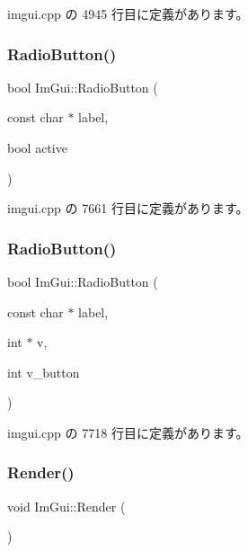 imgui.\+cpp の 4945 行目に定義があります。

\mbox{\label{namespace_im_gui_a6b146763845cbad5a4144772279631bc}} 
\subsubsection{\texorpdfstring{Radio\+Button()}{RadioButton()}\hspace{0.1cm}{\footnotesize\ttfamily [1/2]}}
{\footnotesize\ttfamily bool Im\+Gui\+::\+Radio\+Button (\begin{DoxyParamCaption}\item[{const char $\ast$}]{label,  }\item[{bool}]{active }\end{DoxyParamCaption})}



 imgui.\+cpp の 7661 行目に定義があります。

\mbox{\label{namespace_im_gui_a018d2b61d2f00bb7a9dd2b1f933b93a5}} 
\subsubsection{\texorpdfstring{Radio\+Button()}{RadioButton()}\hspace{0.1cm}{\footnotesize\ttfamily [2/2]}}
{\footnotesize\ttfamily bool Im\+Gui\+::\+Radio\+Button (\begin{DoxyParamCaption}\item[{const char $\ast$}]{label,  }\item[{int $\ast$}]{v,  }\item[{int}]{v\+\_\+button }\end{DoxyParamCaption})}



 imgui.\+cpp の 7718 行目に定義があります。

\mbox{\label{namespace_im_gui_ab51a164f547317c16c441f1599e3946d}} 
\subsubsection{\texorpdfstring{Render()}{Render()}}
{\footnotesize\ttfamily void Im\+Gui\+::\+Render (\begin{DoxyParamCaption}{ }\end{DoxyParamCaption})}




